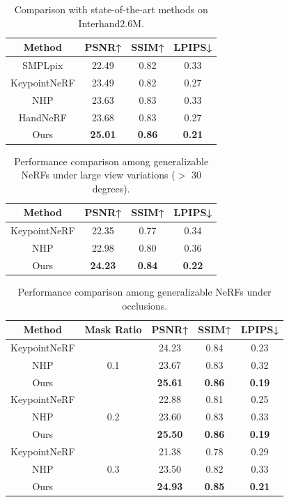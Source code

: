 \documentclass[letterpaper]{article} %
\begin{document}
\begin{table}[t]
    \caption{Comparison with state-of-the-art methods on Interhand2.6M.}
    \label{tab:Comparison}
    \centering
    \begin{tabular}{cccc}
        \toprule
        Method     & PSNR↑    & SSIM↑    & LPIPS↓     \\
        \midrule
        SMPLpix & 22.49 & 0.82 & 0.33 \\
        KeypointNeRF & 23.49   & 0.82  & 0.27   \\
        NHP & 23.63   & 0.83  & 0.33     \\
        HandNeRF & 23.68 & 0.83 & 0.27 \\ \hline
        Ours     &\textbf{25.01}   & \textbf{0.86}   & \textbf{0.21}  \\
        \bottomrule
    \end{tabular}
\end{table}

\begin{table}[t]
    \caption{Performance comparison among generalizable NeRFs under large view variations ($>$ 30 degrees).}
    \label{tab:quanti_view}
    \centering
    \begin{tabular}{cccc}
    \toprule
        Method     & PSNR↑    & SSIM↑    & LPIPS↓     \\
        \midrule
        KeypointNeRF & 22.35 & 0.77 & 0.34 \\
        NHP & 22.98 & 0.80 & 0.36 \\
        Ours & \textbf{24.23} & \textbf{0.84} & \textbf{0.22} \\
        \bottomrule
    \end{tabular}
\end{table}


\begin{table}[!t]
\centering
\caption{Performance comparison among generalizable NeRFs under occlusions.}
\label{tab:quanti_mask}
\small
\begin{tabular}{ccccc}
\toprule
Method  & Mask Ratio & PSNR↑    & SSIM↑    & LPIPS↓     \\
\midrule
KeypointNeRF & \multirow[c]{3}{*}{0.1} &  24.23  &  0.84  &  0.23  \\
NHP &  &  23.67   &  0.83   &  0.32     \\
Ours &  &  \textbf{25.61}    &  \textbf{0.86}     &  \textbf{0.19}      \\ \hline
KeypointNeRF & \multirow[c]{3}{*}{0.2} &  22.88  &   0.81   & 0.25      \\
NHP &  & 23.60 &  0.83   &     0.33   \\
Ours &  &   \textbf{25.50}   &  \textbf{0.86}    &   \textbf{0.19}   \\ \hline
KeypointNeRF & \multirow[c]{3}{*}{0.3} &  21.38  &   0.78   &     0.29  \\
NHP &  &  23.50   &   0.82  &   0.33    \\
Ours &  &   \textbf{24.93}    &  \textbf{0.85}     &  \textbf{0.21}  \\
\bottomrule
\end{tabular}
\end{table}
\end{document}
